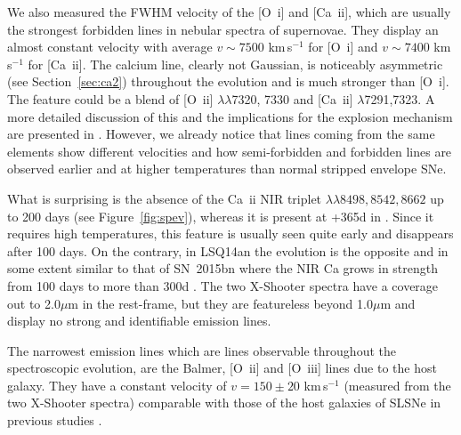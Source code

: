 \documentclass[useAMS,usenatbib]{mn2e}
\def\kms{km\,s$^{-1}$}
\def\an{LSQ14an}
\def\oiii{[O~{\sc iii}]}
\def\oii{[O~{\sc ii}]}
\begin{document}
We also measured the FWHM velocity of the  [O~{\sc i}] and [Ca~{\sc ii}], which are usually 
the strongest forbidden lines in nebular spectra of supernovae. They display an almost constant velocity with average $v\sim7500$ \kms\/ for [O~{\sc i}] and  $v\sim7400$ \kms\/ for [Ca~{\sc ii}].
The calcium line, clearly not Gaussian, is noticeably asymmetric (see Section~\ref{sec:ca2}) throughout the evolution and is much stronger than [O~{\sc i}]. 
The feature could be a blend of [O~{\sc ii}] $\lambda\lambda$7320, 7330
and  [Ca~{\sc ii}] $\lambda$7291,7323. A more detailed discussion of this and the implications 
for the explosion mechanism are presented in \citet{je16}.  However, we already notice that lines coming from the same elements show different velocities and how semi-forbidden and forbidden lines are observed earlier and at higher temperatures than normal stripped envelope SNe. 

What is surprising is the absence of the Ca~{\sc ii} NIR triplet $\lambda\lambda 8498, 8542, 8662$ up to 200 days (see Figure~\ref{fig:spev}), whereas it is present at +365d in \citet{je16}. Since it requires high temperatures, this feature is usually seen quite early and disappears after 100 days. On the contrary, in \an\/ the evolution is the opposite and in some extent similar to that of SN~2015bn where the NIR Ca grows in strength from 100 days to more than 300d \citep{ni16b,je16}. 
The two X-Shooter spectra 
have a coverage out to 2.0$\mu$m in the rest-frame, but they are featureless beyond 
1.0$\mu$m and display no strong and identifiable emission lines. 

The narrowest emission lines which are lines observable throughout the spectroscopic evolution, are the Balmer, \oii\/ and  \oiii\/ lines  due to the host galaxy. They have a constant velocity of $v=150\pm20$ \kms\/ (measured from the two X-Shooter spectra) comparable with those of
the host galaxies of SLSNe in previous studies \citep[e.g.][]{le15}.
\end{document}
